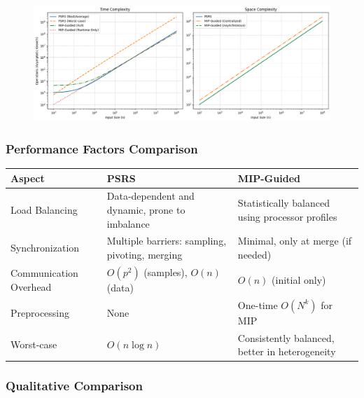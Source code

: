 \documentclass[]{interact}
\theoremstyle{plain}
\theoremstyle{definition}
\theoremstyle{remark}
\begin{document}
\begin{figure}[h] %
    \centering
    \includegraphics[width=1\textwidth]{graph-complexity.png}
    \label{fig:example}
\end{figure}


\subsubsection{Performance Factors Comparison}

\begin{table}[H]
\begin{tabular}{|p{3cm}|p{5cm}|p{5cm}|}
\hline
\textbf{Aspect} & \textbf{PSRS} & \textbf{MIP-Guided} \\
\hline
Load Balancing & Data-dependent and dynamic, prone to imbalance & Statistically balanced using processor profiles \\
\hline
Synchronization & Multiple barriers: sampling, pivoting, merging & Minimal, only at merge (if needed) \\
\hline
Communication Overhead & $O(p^2)$ (samples), $O(n)$ (data) & $O(n)$ (initial only) \\
\hline
Preprocessing & None & One-time $O(N^k)$ for MIP \\
\hline
Worst-case & $O(n \log n)$ & Consistently balanced, better in heterogeneity \\
\hline
\end{tabular}
\end{table}


\subsubsection{Qualitative Comparison}
\end{document}
